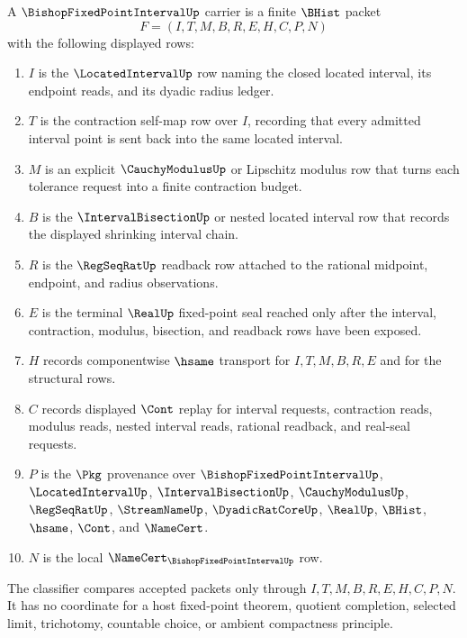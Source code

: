 \begin{definition}
\label{def:bishop-fixed-point-interval-carrier}
A $\BishopFixedPointIntervalUp$ carrier is a finite $\BHist$ packet
$$
F=(I,T,M,B,R,E,H,C,P,N)
$$
with the following displayed rows:
\begin{enumerate}
\item $I$ is the $\LocatedIntervalUp$ row naming the closed located interval, its endpoint reads, and its dyadic radius ledger.
\item $T$ is the contraction self-map row over $I$, recording that every admitted interval point is sent back into the same located interval.
\item $M$ is an explicit $\CauchyModulusUp$ or Lipschitz modulus row that turns each tolerance request into a finite contraction budget.
\item $B$ is the $\IntervalBisectionUp$ or nested located interval row that records the displayed shrinking interval chain.
\item $R$ is the $\RegSeqRatUp$ readback row attached to the rational midpoint, endpoint, and radius observations.
\item $E$ is the terminal $\RealUp$ fixed-point seal reached only after the interval, contraction, modulus, bisection, and readback rows have been exposed.
\item $H$ records componentwise $\hsame$ transport for $I,T,M,B,R,E$ and for the structural rows.
\item $C$ records displayed $\Cont$ replay for interval requests, contraction reads, modulus reads, nested interval reads, rational readback, and real-seal requests.
\item $P$ is the $\Pkg$ provenance over $\BishopFixedPointIntervalUp$, $\LocatedIntervalUp$, $\IntervalBisectionUp$, $\CauchyModulusUp$, $\RegSeqRatUp$, $\StreamNameUp$, $\DyadicRatCoreUp$, $\RealUp$, $\BHist$, $\hsame$, $\Cont$, and $\NameCert$.
\item $N$ is the local $\NameCert_{\BishopFixedPointIntervalUp}$ row.
\end{enumerate}
The classifier compares accepted packets only through $I,T,M,B,R,E,H,C,P,N$. It has no coordinate for a host fixed-point theorem, quotient completion, selected limit, trichotomy, countable choice, or ambient compactness principle.
\end{definition}

